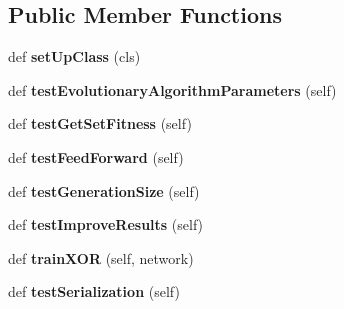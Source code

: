\subsection*{Public Member Functions}
\begin{DoxyCompactItemize}
\item 
def {\bfseries set\+Up\+Class} (cls)\hypertarget{classpyvolutionTest_1_1pyvolutionTest_ae7125b403018667f66e9f3bd3e1d8d81}{}\label{classpyvolutionTest_1_1pyvolutionTest_ae7125b403018667f66e9f3bd3e1d8d81}

\item 
def {\bfseries test\+Evolutionary\+Algorithm\+Parameters} (self)\hypertarget{classpyvolutionTest_1_1pyvolutionTest_a7917d35ed20e2d9aa232e02438259dba}{}\label{classpyvolutionTest_1_1pyvolutionTest_a7917d35ed20e2d9aa232e02438259dba}

\item 
def {\bfseries test\+Get\+Set\+Fitness} (self)\hypertarget{classpyvolutionTest_1_1pyvolutionTest_a03e3607cdb140367cdcce4b98dc60dd1}{}\label{classpyvolutionTest_1_1pyvolutionTest_a03e3607cdb140367cdcce4b98dc60dd1}

\item 
def {\bfseries test\+Feed\+Forward} (self)\hypertarget{classpyvolutionTest_1_1pyvolutionTest_a5671643d8329b03799e9d2c6bf933c77}{}\label{classpyvolutionTest_1_1pyvolutionTest_a5671643d8329b03799e9d2c6bf933c77}

\item 
def {\bfseries test\+Generation\+Size} (self)\hypertarget{classpyvolutionTest_1_1pyvolutionTest_a8d4cfbbedea4b1aa2a0544b70571e4ea}{}\label{classpyvolutionTest_1_1pyvolutionTest_a8d4cfbbedea4b1aa2a0544b70571e4ea}

\item 
def {\bfseries test\+Improve\+Results} (self)\hypertarget{classpyvolutionTest_1_1pyvolutionTest_acd0560d5f7d7ea858799d37102c632d0}{}\label{classpyvolutionTest_1_1pyvolutionTest_acd0560d5f7d7ea858799d37102c632d0}

\item 
def {\bfseries train\+X\+OR} (self, network)\hypertarget{classpyvolutionTest_1_1pyvolutionTest_afb521a424c2061b4393044cc2afc74f8}{}\label{classpyvolutionTest_1_1pyvolutionTest_afb521a424c2061b4393044cc2afc74f8}

\item 
def {\bfseries test\+Serialization} (self)\hypertarget{classpyvolutionTest_1_1pyvolutionTest_a540276d681fd27876a065c7da9d04085}{}\label{classpyvolutionTest_1_1pyvolutionTest_a540276d681fd27876a065c7da9d04085}


\end{DoxyCompactItemize}
